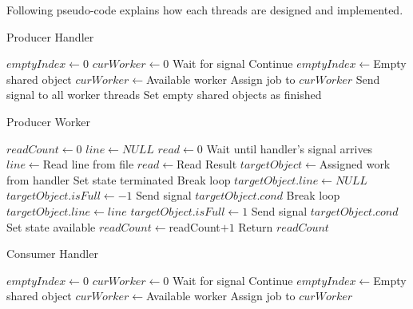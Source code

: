 \documentclass{homework}
\begin{document}
Following pseudo-code explains how each threads are designed and implemented.
\par

\begin{algorithm}
\caption{Producer Handler}\label{alg:cap}
\begin{algorithmic}
\State $emptyIndex \gets 0$
\State $curWorker \gets 0$
    \State Wait for signal  
    \State Continue 
\EndIf
\State $emptyIndex \gets $Empty shared object  
\State $curWorker \gets $Available worker
\State Assign job to $curWorker$
\EndWhile
{}
\State Send signal to all worker threads  
\State Set empty shared objects as finished
\EndWhile
\end{algorithmic}
\end{algorithm}

\begin{algorithm}
\caption{Producer Worker}\label{alg:cap}
\begin{algorithmic}
\State $readCount \gets 0$
\State $line \gets NULL$
\State $read \gets 0$
\State Wait until handler's signal arrives
\State $line \gets $Read line from file  
\State $read \gets $Read Result
\State $targetObject \gets $Assigned work from handler
    \State Set state terminated
    \State Break loop
\EndIf
{}
    \State $targetObject.line \gets NULL$  
    \State $targetObject.isFull \gets -1$
    \State Send signal $targetObject.cond$  
    \State Break loop
\EndIf
\State $targetObject.line \gets line$  
\State $targetObject.isFull \gets 1$
\State Send signal $targetObject.cond$ 
\State Set state available
\State $readCount \gets $readCount$ + 1$
\EndWhile
\State Return $readCount$
\end{algorithmic}
\end{algorithm}


\begin{algorithm}
\caption{Consumer Handler}\label{alg:cap}
\begin{algorithmic}
\State $emptyIndex \gets 0$
\State $curWorker \gets 0$
    \State Wait for signal  
    \State Continue 
\EndIf
\State $emptyIndex \gets $Empty shared object  
\State $curWorker \gets $Available worker
\State Assign job to $curWorker$
\EndWhile
\end{algorithmic}
\end{algorithm}
\end{document}
